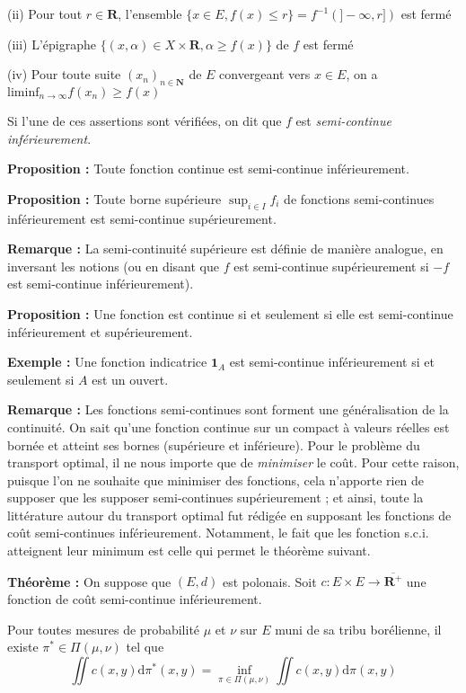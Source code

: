 \documentclass[12pt]{article}
\begin{document}
(ii) Pour tout $r \in \mathbf R$, l'ensemble $\{x \in E, f(x) \leqslant r\} = f^{-1}(]-\infty, r])$ est fermé

(iii) L'épigraphe $ \{ (x,\alpha) \in X \times \mathbf R, \alpha \geqslant f(x) \}$ de $f$ est fermé

(iv) Pour toute suite $(x_n)_{n \in \mathbf N} $ de $E$ convergeant vers $ x \in E$, on a $ \displaystyle \mathrm{lim inf}_{n \to \infty} f(x_n) \geqslant f(x)$

Si l'une de ces assertions sont vérifiées, on dit que $f$ est \textit{semi-continue inférieurement}.

\textbf{Proposition :} Toute fonction continue est semi-continue inférieurement. 

\textbf{Proposition :} Toute borne supérieure $ \displaystyle \sup_{i \in I } f_i $ de fonctions semi-continues inférieurement est semi-continue supérieurement.

\textbf{Remarque :} La semi-continuité supérieure est définie de manière analogue, en inversant les notions (ou en disant que $f$ est semi-continue supérieurement si $-f$ est semi-continue inférieurement).

\textbf{Proposition :} Une fonction est continue si et seulement si elle est semi-continue inférieurement et supérieurement. 

\textbf{Exemple :} Une fonction indicatrice $ \mathbf{1}_A $ est semi-continue inférieurement si et seulement si $A$ est un ouvert.

\textbf{Remarque :} Les fonctions semi-continues sont forment une généralisation de la continuité. On sait qu'une fonction continue sur un compact à valeurs réelles est bornée et atteint ses bornes (supérieure et inférieure). Pour le problème du transport optimal, il ne nous importe que de \textit{minimiser} le coût. Pour cette raison, puisque l'on ne souhaite que minimiser des fonctions, cela n'apporte rien de supposer que les supposer semi-continues supérieurement ; et ainsi, toute la littérature autour du transport optimal fut rédigée en supposant les fonctions de coût semi-continues inférieurement. Notamment, le fait que les fonction s.c.i. atteignent leur minimum est celle qui permet le théorème suivant.

\textbf{Théorème :} On suppose que $(E,d)$ est polonais. Soit $ c : E \times E \to \overline {\mathbf R^+} $ une fonction de coût semi-continue inférieurement.

Pour toutes mesures de probabilité $ \mu $ et $ \nu$ sur $E$ muni de sa tribu borélienne, il existe $ \pi^* \in \Pi(\mu,\nu)$ tel que $$ \iint c(x,y) \mathrm d \pi^*(x,y) = \inf_{\pi \in \Pi(\mu, \nu)} \iint  c(x,y) \mathrm d \pi(x,y) $$
\end{document}
